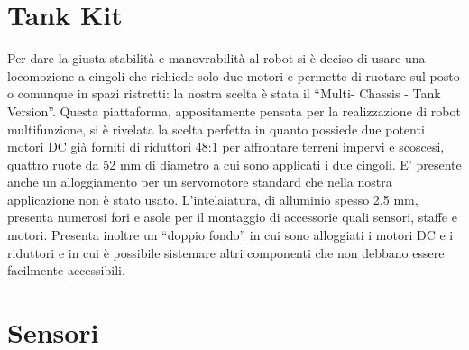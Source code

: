\section {Tank Kit}
Per dare la giusta stabilità e manovrabilità al robot si è deciso di usare una
 locomozione a cingoli che richiede solo due motori e permette di ruotare sul 
 posto o comunque in spazi ristretti: la nostra scelta è stata il ``Multi-
 Chassis - Tank Version''. Questa piattaforma, appositamente pensata per la 
 realizzazione di robot multifunzione, si è rivelata la scelta perfetta in 
 quanto possiede due potenti motori DC già forniti di riduttori 48:1 per 
 affrontare terreni impervi e scoscesi, quattro ruote da 52 mm di diametro a 
 cui sono applicati i due cingoli. E' presente anche un alloggiamento per un 
 servomotore standard che nella nostra applicazione non è stato usato. 
 L'intelaiatura, di alluminio spesso 2,5 mm, presenta numerosi fori e asole
  per il montaggio di accessorie quali sensori, staffe e motori. Presenta
  inoltre un ``doppio fondo'' in cui sono alloggiati i motori DC e i riduttori 
  e in cui è possibile sistemare altri componenti che non debbano essere 
  facilmente accessibili.
\section {Sensori}
